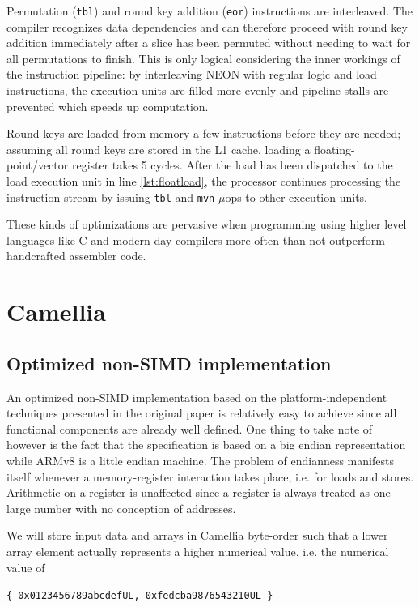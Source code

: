 Permutation (\texttt{tbl}) and round key addition (\texttt{eor}) instructions
are interleaved. The compiler recognizes data dependencies and can therefore
proceed with round key addition immediately after a slice has been permuted
without needing to wait for all permutations to finish. This is only logical
considering the inner workings of the instruction pipeline: by interleaving
NEON with regular logic and load instructions, the execution units are filled
more evenly and pipeline stalls are prevented which speeds up computation.

Round keys are loaded from memory a few instructions before they are needed;
assuming all round keys are stored in the L1 cache, loading a
floating-point/vector register takes 5 cycles. After the load has been
dispatched to the load execution unit in line \ref{lst:floatload}, the
processor continues processing the instruction stream by issuing \texttt{tbl}
and \texttt{mvn} $\mu$ops to other execution units.

These kinds of optimizations are pervasive when programming using higher level
languages like C and modern-day compilers more often than not outperform
handcrafted assembler code.

\section{Camellia}
\subsection{Optimized non-SIMD implementation}

An optimized non-SIMD implementation based on the platform-independent
techniques presented in the original paper \cite{camellia:2001} is relatively
easy to achieve since all functional components are already well defined. One
thing to take note of however is the fact that the specification is based on a
big endian representation while ARMv8 is a little endian machine. The problem
of endianness manifests itself whenever a memory-register interaction takes
place, i.e. for loads and stores. Arithmetic on a register is unaffected since
a register is always treated as one large number with no conception of
addresses.

We will store input data and arrays in Camellia byte-order such that a lower
array element actually represents a higher numerical value, i.e. the numerical
value of

\begin{center}
    \texttt{\{ 0x0123456789abcdefUL, 0xfedcba9876543210UL \}}
\end{center}

